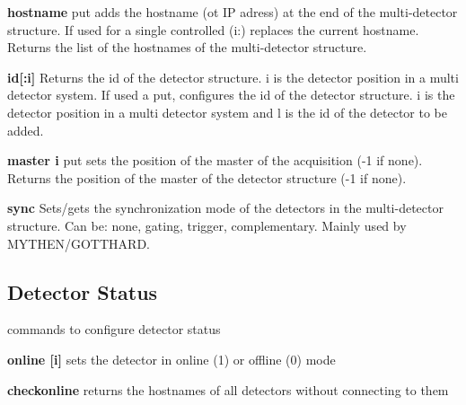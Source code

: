 \begin{DoxyItemize}
\item {\bfseries hostname} {\ttfamily put} adds the hostname (ot IP adress) at the end of the multi-\/detector structure. If used for a single controlled (i:) replaces the current hostname. Returns the list of the hostnames of the multi-\/detector structure.
\end{DoxyItemize}


\begin{DoxyItemize}
\item {\bfseries id\mbox{[}:i\mbox{]}} Returns the id of the detector structure. i is the detector position in a multi detector system. If used a {\ttfamily put}, configures the id of the detector structure. i is the detector position in a multi detector system and l is the id of the detector to be added.
\end{DoxyItemize}


\begin{DoxyItemize}
\item {\bfseries master i} {\ttfamily put} sets the position of the master of the acquisition (-\/1 if none). Returns the position of the master of the detector structure (-\/1 if none).
\end{DoxyItemize}


\begin{DoxyItemize}
\item {\bfseries sync} Sets/gets the synchronization mode of the detectors in the multi-\/detector structure. Can be: {\ttfamily none}, {\ttfamily gating}, {\ttfamily trigger}, {\ttfamily complementary}. Mainly used by MYTHEN/GOTTHARD.
\end{DoxyItemize}\hypertarget{config_detstatus}{}\subsection{Detector Status}\label{config_detstatus}
commands to configure detector status


\begin{DoxyItemize}
\item {\bfseries online \mbox{[}i\mbox{]}} sets the detector in online (1) or offline (0) mode
\end{DoxyItemize}


\begin{DoxyItemize}
\item {\bfseries checkonline} returns the hostnames of all detectors without connecting to them
\end{DoxyItemize}


